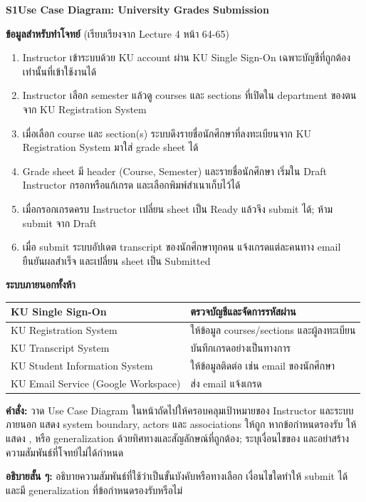 \medskip
\textbf{S1\quad Use Case Diagram: University Grades Submission}\par
\textbf{ข้อมูลสำหรับทำโจทย์} (เรียบเรียงจาก Lecture 4 หน้า 64-65)\par
\begin{enumerate}[itemsep=3pt]
\item Instructor เข้าระบบด้วย KU account ผ่าน KU Single Sign-On เฉพาะบัญชีที่ถูกต้องเท่านั้นที่เข้าใช้งานได้
\item Instructor เลือก semester แล้วดู courses และ sections ที่เปิดใน department ของตนจาก KU Registration System
\item เมื่อเลือก course และ section(s) ระบบดึงรายชื่อนักศึกษาที่ลงทะเบียนจาก KU Registration System มาใส่ grade sheet ได้
\item Grade sheet มี header (Course, Semester) และรายชื่อนักศึกษา เริ่มใน Draft Instructor กรอกหรือแก้เกรด และเลือกพิมพ์สำเนาเก็บไว้ได้
\item เมื่อกรอกเกรดครบ Instructor เปลี่ยน sheet เป็น Ready แล้วจึง submit ได้; ห้าม submit จาก Draft
\item เมื่อ submit ระบบอัปเดต transcript ของนักศึกษาทุกคน แจ้งเกรดแต่ละคนทาง email ยืนยันผลสำเร็จ และเปลี่ยน sheet เป็น Submitted
\end{enumerate}
\textbf{ระบบภายนอกทั้งห้า}\par
\begin{tabularx}{\linewidth}{|>{\raggedright\arraybackslash}m{5.3cm}|Y|}\hline
KU Single Sign-On & ตรวจบัญชีและจัดการรหัสผ่าน\\\hline
KU Registration System & ให้ข้อมูล courses/sections และผู้ลงทะเบียน\\\hline
KU Transcript System & บันทึกเกรดอย่างเป็นทางการ\\\hline
KU Student Information System & ให้ข้อมูลติดต่อ เช่น email ของนักศึกษา\\\hline
KU Email Service (Google Workspace) & ส่ง email แจ้งเกรด\\\hline
\end{tabularx}
\par\medskip
\textbf{คำสั่ง:} วาด Use Case Diagram ในหน้าถัดไปให้ครอบคลุมเป้าหมายของ Instructor และระบบภายนอก แสดง system boundary, actors และ associations ให้ถูก หากข้อกำหนดรองรับ ให้แสดง ,  หรือ generalization ด้วยทิศทางและสัญลักษณ์ที่ถูกต้อง; ระบุเงื่อนไขของ  และอย่าสร้างความสัมพันธ์ที่โจทย์ไม่ได้กำหนด\par
\textbf{อธิบายสั้น ๆ:} อธิบายความสัมพันธ์ที่ใช้ว่าเป็นขั้นบังคับหรือทางเลือก เงื่อนไขใดทำให้ submit ได้ และมี generalization ที่ข้อกำหนดรองรับหรือไม่\par
